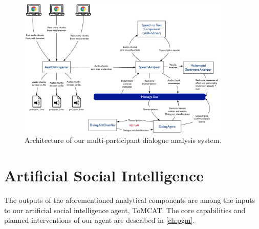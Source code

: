 \begin{figure}
    \centering
    \includegraphics[width=4in]{images/nlp_architecture}
    \caption{Architecture of our multi-participant dialogue analysis system.}
    \label{fig:nlp-architecture}
\end{figure}

\section{Artificial Social Intelligence}

The outputs of the aforementioned analytical components are among the inputs to
our artificial social intelligence agent, ToMCAT. The core capabilities and
planned interventions of our agent are described in \autoref{ch:pgm}.

